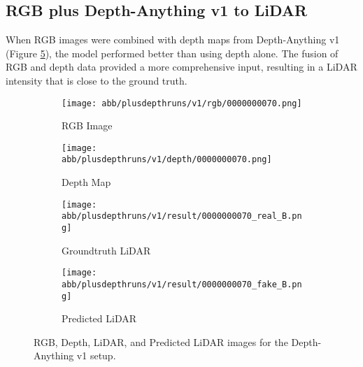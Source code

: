 \subsection{RGB plus Depth-Anything v1 to LiDAR}
When RGB images were combined with depth maps from Depth-Anything v1 (Figure \ref{v1_rgbd}), the model performed better than using depth alone. The fusion of RGB and depth data provided a more comprehensive input, resulting in a LiDAR intensity that is close to the ground truth. 
\begin{figure}[!ht]
	\centering
	\begin{subfigure}{0.4\textwidth}
		\centering
		\texttt{[image: abb/plusdepthruns/v1/rgb/0000000070.png]}
		\caption{RGB Image}
		\label{fig:v1_rgb}
	\end{subfigure}
	
	\vspace{1em} %
	
	\begin{subfigure}{0.4\textwidth}
		\centering
		\texttt{[image: abb/plusdepthruns/v1/depth/0000000070.png]}
		\caption{Depth Map}
		\label{fig:v1_depth}
	\end{subfigure}
	
	\vspace{1em} %
	
	\begin{subfigure}{0.25\textwidth}
		\centering
		\texttt{[image: abb/plusdepthruns/v1/result/0000000070\_real\_B.png]}
		\caption{Groundtruth LiDAR}
		\label{fig:v1_pred_lidar}
	\end{subfigure}
	\begin{subfigure}{0.25\textwidth}
		\centering
		\texttt{[image: abb/plusdepthruns/v1/result/0000000070\_fake\_B.png]}
		\caption{Predicted LiDAR}
		\label{fig:v1_fake_lidar}
	\end{subfigure}
	
	\caption{RGB, Depth, LiDAR, and Predicted LiDAR images for the Depth-Anything v1 setup.}
	\label{v1_rgbd}
\end{figure}
\newpage
